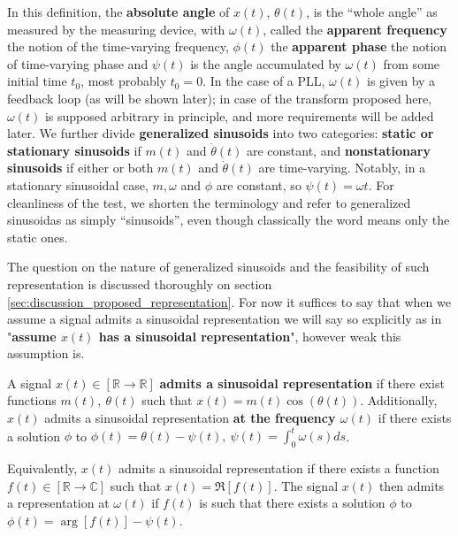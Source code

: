 	In this definition, the \textbf{absolute angle} of $x(t)$, $\theta(t)$, is the ``whole angle'' as measured by the measuring device, with $\omega(t)$, called the \textbf{apparent frequency} the notion of the time-varying frequency, $\phi(t)$ the \textbf{apparent phase} the notion of time-varying phase and $\psi(t)$ is the angle accumulated by $\omega(t)$ from some initial time $t_0$, most probably $t_0 = 0$. In the case of a PLL, $\omega(t)$ is given by a feedback loop (as will be shown later); in case of the transform proposed here, $\omega(t)$ is supposed arbitrary in principle, and more requirements will be added later. We further divide \textbf{generalized sinusoids} into two categories: \textbf{static or stationary sinusoids} if $m(t)$ and $\dot{\theta}(t)$ are constant, and \textbf{nonstationary sinusoids} if either or both $m(t)$ and $\dot{\theta}(t)$ are time-varying. Notably, in a stationary sinusoidal case, $m,\omega$ and $\phi$ are constant, so $\psi(t) = \omega t$. For cleanliness of the test, we shorten the terminology and refer to generalized sinusoidas as simply ``sinusoids'', even though classically the word means only the static ones.

	The question on the nature of generalized sinusoids and the feasibility of such representation is discussed thoroughly on section \ref{sec:discussion_proposed_representation}. For now it suffices to say that when we assume a signal admits a sinusoidal representation we will say so explicitly as in "\textbf{assume $x(t)$ has a sinusoidal representation}", however weak this assumption is.

\begin{definition} A signal $x(t)\in\left[\mathbb{R}\to\mathbb{R}\right]$ \textbf{admits a sinusoidal representation} if there exist functions $m(t),\ \theta(t)$ such that $x(t) = m(t)\cos\left(\theta(t)\right)$. Additionally, $x(t)$ admits a sinusoidal representation \textbf{at the frequency $\omega(t)$} if there exists a solution $\phi$ to $\phi(t) = \theta(t) - \psi(t),\ \psi(t) = \int_0^t \omega(s)ds$.

	Equivalently, $x(t)$ admits a sinusoidal representation if there exists a function $f(t)\in\left[\mathbb{R}\to\mathbb{C}\right]$ such that $x(t) = \Re\left[f(t)\right]$. The signal $x(t)$ then admits a representation at $\omega(t)$ if $f(t)$ is such that there exists a solution $\phi$ to $\phi(t) = \arg\left[f(t)\right] - \psi(t)$.
\end{definition}

